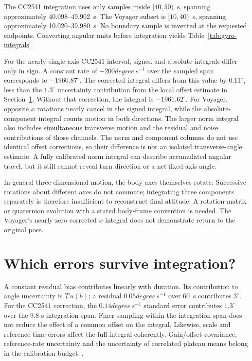The CC2541 integration uses only samples inside $[40,50)$~s, spanning approximately 40.098--49.902~s. The Voyager subset is $[10,40)$~s, spanning approximately 10.020--39.980~s. No boundary sample is invented at the requested endpoints. Converting angular units before integration yields Table~\ref{tab:gyro-integrals}.

For the nearly single-axis CC2541 interval, signed and absolute integrals differ only in sign. A constant rate of $-200\unit{degree\,s^{-1}}$ over the sampled span corresponds to $-1960.87^\circ$. The corrected integral differs from this value by $0.11^\circ$, less than the $1.3^\circ$ uncertainty contribution from the local offset estimate in Section~\ref{sec:gyro-errors}. Without that correction, the integral is $-1961.62^\circ$. For Voyager, opposite $x$ rotations nearly cancel in the signed integral, while the absolute-component integral counts motion in both directions. The larger norm integral also includes simultaneous transverse motion and the residual and noise contributions of those channels. The norm and component columns do not use identical offset corrections, so their difference is not an isolated transverse-angle estimate. A fully calibrated norm integral can describe accumulated angular travel, but it still cannot reveal turn direction or a net fixed-axis angle.

In general three-dimensional motion, the body axes themselves rotate. Successive rotations about different axes do not commute; integrating three components separately is therefore insufficient to reconstruct final attitude. A rotation-matrix or quaternion evolution with a stated body-frame convention is needed. The Voyager's nearly zero corrected $x$ integral does not demonstrate return to the original pose.

\section{Which errors survive integration?}
\label{sec:gyro-errors}
A constant residual bias contributes linearly with duration. Its contribution to angle uncertainty is $T\,u(b)$; a residual $0.05\unit{degree\,s^{-1}}$ over 60~s contributes $3^\circ$. For the CC2541 correction, the $0.14\unit{degree\,s^{-1}}$ standard error contributes $1.3^\circ$ over the 9.8-s integration span. Finer sampling within the integration span does not reduce the effect of a common offset on the integral. Likewise, scale and reference-time errors affect the full integral coherently. Gain/offset covariance, reference-rate uncertainty and the uncertainty of correlated plateau means belong in the calibration budget~\cite{gum}.

